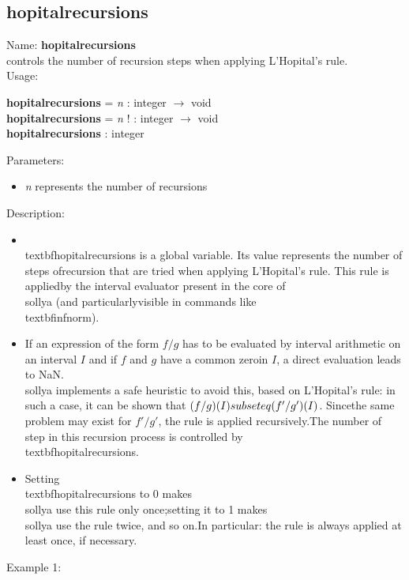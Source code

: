 \subsection{hopitalrecursions}
\label{labhopitalrecursions}
\noindent Name: \textbf{hopitalrecursions}\\
controls the number of recursion steps when applying L'Hopital's rule.\\
\noindent Usage: 
\begin{center}
\textbf{hopitalrecursions} = \emph{n} : \textsf{integer} $\rightarrow$ \textsf{void}\\
\textbf{hopitalrecursions} = \emph{n} ! : \textsf{integer} $\rightarrow$ \textsf{void}\\
\textbf{hopitalrecursions} : \textsf{integer}\\
\end{center}
Parameters: 
\begin{itemize}
\item \emph{n} represents the number of recursions
\end{itemize}
\noindent Description: \begin{itemize}

\item \\textbf{hopitalrecursions} is a global variable. Its value represents the number of steps of\n   recursion that are tried when applying L'Hopital's rule. This rule is applied\n   by the interval evaluator present in the core of \\sollya (and particularly\n   visible in commands like \\textbf{infnorm}).\n
\item If an expression of the form $f/g$ has to be evaluated by interval \n   arithmetic on an interval $I$ and if $f$ and $g$ have a common zero\n   in $I$, a direct evaluation leads to NaN.\n   \\sollya implements a safe heuristic to avoid this, based on L'Hopital's rule: in \n   such a case, it can be shown that $(f/g)(I) \\subseteq (f'/g')(I)$. Since\n   the same problem may exist for $f'/g'$, the rule is applied recursively.\n   The number of step in this recursion process is controlled by \\textbf{hopitalrecursions}.\n
\item Setting \\textbf{hopitalrecursions} to 0 makes \\sollya use this rule only once;\n   setting it to 1 makes \\sollya use the rule twice, and so on.\n   In particular: the rule is always applied at least once, if necessary.\n\end{itemize}
\noindent Example 1: 
\begin{center}\begin{minipage}{15cm}\begin{Verbatim}[frame=single]
\end{Verbatim}
\end{minipage}\end{center}
